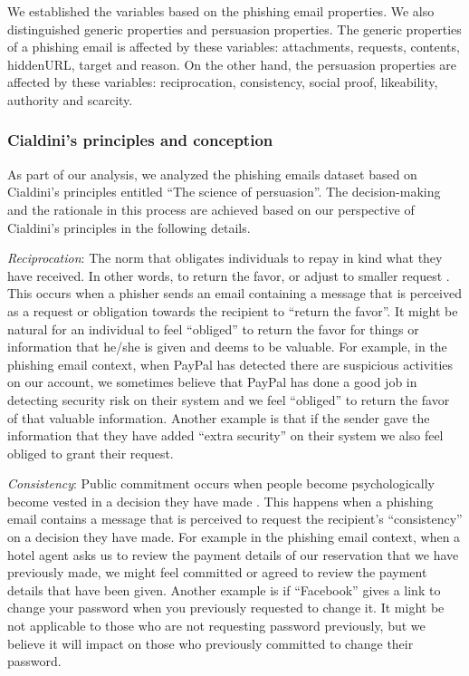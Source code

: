 We established the variables based on the phishing email properties.
We also distinguished generic properties and persuasion properties.
The generic properties of a phishing email is affected by these variables:
attachments, requests, contents, hiddenURL, target and reason. On
the other hand, the persuasion properties are affected by these variables:
reciprocation, consistency, social proof, likeability, authority and
scarcity.


\subsubsection{\label{sub:cialdini}Cialdini's principles and conception}

As part of our analysis, we analyzed the phishing emails dataset based
on Cialdini\textquoteright s principles entitled \textquotedblleft The
science of persuasion\textquotedblright . The decision-making and
the rationale in this process are achieved based on our perspective
of Cialdini\textquoteright s principles in the following details. 

\textit{Reciprocation}: The norm that obligates individuals to repay
in kind what they have received. In other words, to return the favor,
or adjust to smaller request \cite{cialdini:2001}. This occurs when
a phisher sends an email containing a message that is perceived as
a request or obligation towards the recipient to \textquotedblleft return
the favor\textquotedblright . It might be natural for an individual
to feel \textquotedblleft obliged\textquotedblright{} to return the
favor for things or information that he/she is given and deems to
be valuable. For example, in the phishing email context, when PayPal
has detected there are suspicious activities on our account, we sometimes
believe that PayPal has done a good job in detecting security risk
on their system and we feel \textquotedblleft obliged\textquotedblright{}
to return the favor of that valuable information. Another example
is that if the sender gave the information that they have added \textquotedblleft extra
security\textquotedblright{} on their system we also feel obliged
to grant their request.

\emph{Consistency}: Public commitment occurs when people become psychologically
become vested in a decision they have made \cite{workman:2008}. This
happens when a phishing email contains a message that is perceived
to request the recipient's \textquotedblleft consistency\textquotedblright{}
on a decision they have made. For example in the phishing email context,
when a hotel agent asks us to review the payment details of our reservation
that we have previously made, we might feel committed or agreed to
review the payment details that have been given. Another example is
if \textquotedblleft Facebook\textquotedblright{} gives a link to
change your password when you previously requested to change it. It
might be not applicable to those who are not requesting password previously,
but we believe it will impact on those who previously committed to
change their password. 

